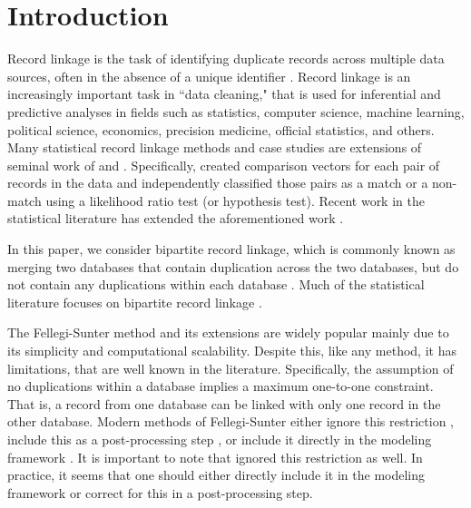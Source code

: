 \documentclass[12pt,letterpaper]{article}
\newcommand{\1}[1]{\mathbb{I}\!\left[#1\right]} %
\def\spacingset#1{\renewcommand{\baselinestretch}%
  {#1}\small\normalsize} \spacingset{1}
\begin{document}
\newpage
\spacingset{1.5}

\section{Introduction}
\label{sec:introduction}



Record linkage is the task of identifying duplicate records across multiple data sources, often in the absence of a unique identifier \citep{christen_2012}. Record linkage is an increasingly important task in ``data cleaning," that is used for inferential and predictive analyses in fields such as statistics, computer science, machine learning, political science, economics, precision medicine, official statistics, and others. Many statistical record linkage methods and case studies are extensions of seminal work of \cite{fellegi_theory_1969} and \cite{newcombe_automatic_1959}. Specifically, \cite{fellegi_theory_1969} created comparison vectors for each pair of records in the data and independently classified those pairs as a match or a non-match using a likelihood ratio test (or hypothesis test). Recent work in the statistical literature has extended the aforementioned work \citep{winkler1991application, fair2004generalized, wagner2014person, gill2003english}. 


In this paper, we consider bipartite record linkage, which is commonly known as merging two databases that contain duplication across the two databases, but do not contain any duplications within each database \citep{sadinle_bayesian_2017}. Much of the statistical literature focuses on bipartite record linkage \citep{fellegi_theory_1969, jaro1989, Winkler1988, belin_1995, larsen_2001, liseo_2011,  herzog2007data, gutman_bayesian_2013, sadinle_bayesian_2017}. 

The Fellegi-Sunter method and its extensions are widely popular mainly due to its simplicity and computational scalability. Despite this, like any method, it has limitations, that are well known in the literature. Specifically, the assumption of no duplications within a database implies a maximum one-to-one constraint. That is, a record from one database can be linked with only one record in the other database. Modern methods of Fellegi-Sunter either ignore this restriction \citep{Winkler1988, belin_1995, larsen_2001}, include this as a post-processing step \citep{jaro1989}, or include it directly in the modeling framework \citep{sadinle_bayesian_2017}. It is important to note that \cite{fellegi_theory_1969} ignored this restriction as well. In practice, it seems that one should either directly include it in the modeling framework or correct for this in a post-processing step. 
\end{document}
